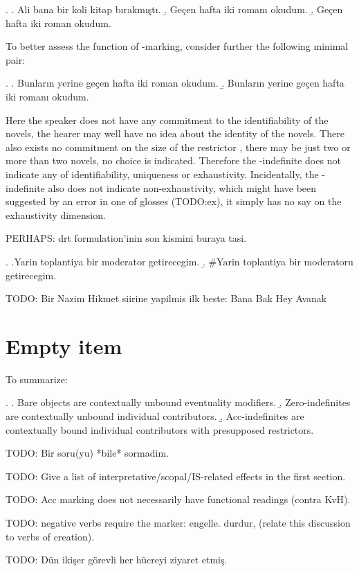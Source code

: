 \documentclass[11pt,a4paper]{article}
\begin{document}
\ex. \a. Ali bana bir koli kitap bırakmıştı.
\b. Geçen hafta iki romanı okudum.
\b. Geçen hafta iki roman okudum.

To better assess the function of \acc-marking, consider further the following minimal pair:

\ex.
\a. Bunların yerine geçen hafta iki roman okudum.
\b. Bunların yerine geçen hafta iki romanı okudum.

Here the speaker does not have any commitment to the identifiability of the
novels, the hearer may well have no idea about the identity of the novels.
There also exists no commitment on the size of the restrictor ,
there may be just two or more than two novels, no choice is indicated.
Therefore the \acc-indefinite does not indicate any of identifiability,
uniqueness or exhaustivity. Incidentally, the \acc-indefinite also does not
indicate non-exhaustivity, which might have been suggested by an error in one
of   glosses (TODO:ex), it simply has no say on the exhaustivity
dimension.


PERHAPS: drt formulation'inin son kismini buraya tasi.


\ex. \a.Yarin toplantiya bir moderator getirecegim.
\b. \#Yarin toplantiya bir moderatoru getirecegim.

TODO: Bir Nazim Hikmet siirine yapilmis ilk beste: Bana Bak Hey Avanak

\section{Empty item}


To summarize:

\ex.
\a. Bare objects are contextually unbound eventuality modifiers.
\b. Zero-indefinites are contextually unbound individual contributors.
\b. Acc-indefinites are contextually bound individual contributors with presupposed restrictors.






TODO: Bir soru(yu) *bile* sormadim.

TODO: Give a list of interpretative/scopal/IS-related effects in the first section.

TODO: Acc marking does not necessarily have functional readings (contra KvH).

TODO: negative verbs require the marker: engelle. durdur, (relate this discussion to verbs of creation).

TODO: Dün ikişer görevli her hücreyi ziyaret etmiş.
\end{document}
